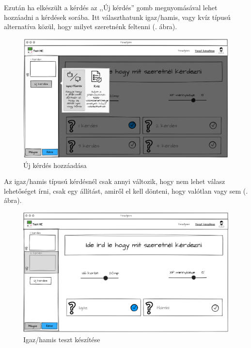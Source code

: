 Ezután ha elkészült a kérdés az ,,Új kérdés'' gomb megnyomásával lehet hozzáadni a kérdések sorába. Itt választhatunk igaz/hamis, vagy kvíz típusú alternatíva közül, hogy milyet szeretnénk feltenni (. ábra).

\begin{figure}[h!]
    \centering
    \includegraphics[width=\linewidth]{images/make_test2_wireframe.png}
    \caption{Új kérdés hozzáadása}
    \label{fig:new_question}
\end{figure}

Az igaz/hamis típusú kérdésnél csak annyi változik, hogy nem lehet válasz lehetőséget írni, csak egy állítást, amiről el kell dönteni, hogy valótlan vagy sem (. ábra).

\begin{figure}[h!]
    \centering
    \includegraphics[width=\linewidth]{images/make_test3_wireframe.png}
    \caption{Igaz/hamis teszt készítése}
    \label{fig:test_true_false}
\end{figure}

